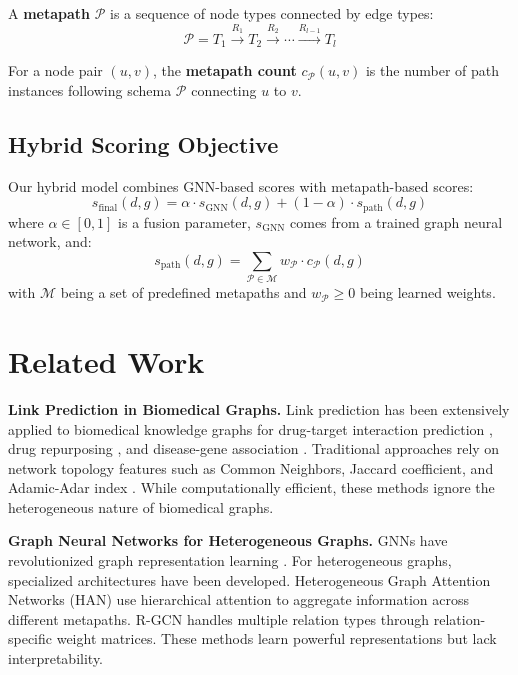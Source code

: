 \documentclass{article}
\newcommand{\set}[1]{\mathcal{#1}}
\begin{document}
A \textbf{metapath} $\set{P}$ is a sequence of node types connected by edge types:
\begin{equation}
    \set{P} = T_1 \xrightarrow{R_1} T_2 \xrightarrow{R_2} \cdots \xrightarrow{R_{l-1}} T_l
\end{equation}

For a node pair $(u, v)$, the \textbf{metapath count} $c_\set{P}(u, v)$ is the number of path instances following schema $\set{P}$ connecting $u$ to $v$.

\subsection{Hybrid Scoring Objective}

Our hybrid model combines GNN-based scores with metapath-based scores:
\begin{equation}
    s_{\text{final}}(d, g) = \alpha \cdot s_{\text{GNN}}(d, g) + (1 - \alpha) \cdot s_{\text{path}}(d, g)
    \label{eq:hybrid}
\end{equation}
where $\alpha \in [0, 1]$ is a fusion parameter, $s_{\text{GNN}}$ comes from a trained graph neural network, and:
\begin{equation}
    s_{\text{path}}(d, g) = \sum_{\set{P} \in \set{M}} w_\set{P} \cdot c_\set{P}(d, g)
    \label{eq:path_score}
\end{equation}
with $\set{M}$ being a set of predefined metapaths and $w_\set{P} \geq 0$ being learned weights.

\section{Related Work}
\label{sec:related}

\textbf{Link Prediction in Biomedical Graphs.}
Link prediction has been extensively applied to biomedical knowledge graphs for drug-target interaction prediction \citep{zitnik2018modeling}, drug repurposing \citep{himmelstein2017systematic}, and disease-gene association \citep{peng2021gene}. Traditional approaches rely on network topology features such as Common Neighbors, Jaccard coefficient, and Adamic-Adar index \citep{liben2003link}. While computationally efficient, these methods ignore the heterogeneous nature of biomedical graphs.

\textbf{Graph Neural Networks for Heterogeneous Graphs.}
GNNs have revolutionized graph representation learning \citep{kipf2016semi, hamilton2017inductive}. For heterogeneous graphs, specialized architectures have been developed. Heterogeneous Graph Attention Networks (HAN) \citep{wang2019heterogeneous} use hierarchical attention to aggregate information across different metapaths. R-GCN \citep{schlichtkrull2018modeling} handles multiple relation types through relation-specific weight matrices. These methods learn powerful representations but lack interpretability.
\end{document}
